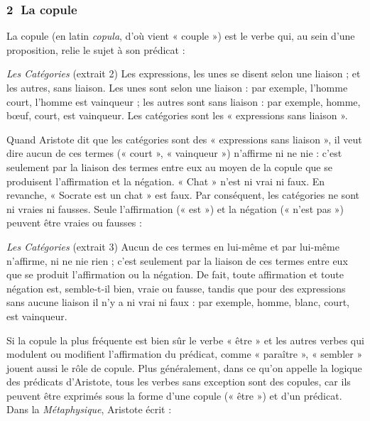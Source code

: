 \subsubsection*{\textcircled{\scriptsize 2} La copule}
La copule (en latin \textit{copula}, d’où vient « couple ») est le verbe qui, au sein d’une proposition, relie le sujet à son prédicat :

\begin{lecture}{\textit{Les Catégories} (extrait 2)}
Les expressions, les unes se disent selon une liaison ; et les autres, sans liaison. Les unes sont selon une liaison : par exemple, l’homme court, l’homme est vainqueur ; les autres sont sans liaison : par exemple, homme, bœuf, court, est vainqueur. Les catégories sont les « expressions sans liaison ».
\end{lecture}

Quand Aristote dit que les catégories sont des « expressions sans liaison », il veut dire aucun de ces termes (« court », « vainqueur ») n’affirme ni ne nie : c’est seulement par la liaison des termes entre eux au moyen de la copule que se produisent l’affirmation et la négation. « Chat » n’est ni vrai ni faux. En revanche, « Socrate est un chat » est faux. Par conséquent, les catégories ne sont ni vraies ni fausses. Seule l’affirmation (« est ») et la négation (« n’est pas ») peuvent être vraies ou fausses :

\begin{lecture}{\textit{Les Catégories} (extrait 3)}
Aucun de ces termes en lui-même et par lui-même n’affirme, ni ne nie rien ; c’est seulement par la liaison de ces termes entre eux que se produit l’affirmation ou la négation. De fait, toute affirmation et toute négation est, semble-t-il bien, vraie ou fausse, tandis que pour des expressions sans aucune liaison il n’y a ni vrai ni faux : par exemple, homme, blanc, court, est vainqueur.
\end{lecture}

Si la copule la plus fréquente est bien sûr le verbe « être » et les autres verbes qui modulent ou modifient l’affirmation du prédicat, comme « paraître », « sembler » jouent aussi le rôle de copule. Plus généralement, dans ce qu’on appelle la logique des prédicats d’Aristote, tous les verbes sans exception sont des copules, car ils peuvent être exprimés sous la forme d’une copule (« être ») et d’un prédicat. Dans la \textit{Métaphysique}, Aristote écrit :

